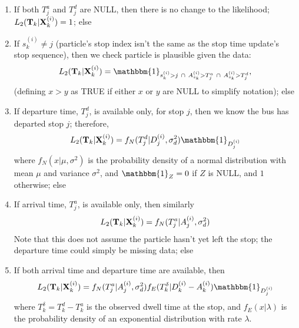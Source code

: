 \documentclass[draftcls,a4paper,onecolumn]{IEEEtran}\usepackage[]{graphicx}\usepackage[]{color}
\begin{document}
\begin{enumerate}
\item 
  If both $T^a_j$ and $T^d_j$ are NULL, 
  then there is no change to the likelihood;
  $ L_2  (\mathbf{T}_k | \mathbf{X}_k^{(i)}) = 1 $; else
  
\item
  If $s_k^{(i)} \neq j$ (particle's stop index isn't the same as the stop time update's stop sequence),
  then we check particle is plausible given the data:
  \begin{equation}
    \label{eq:l2a}
    L_2 (\bT_k | \bX_k^{(i)}) =
    \mathbbm{1}_{s_k^{(i)} > j\ \cap\ A_{s_k}^{(i)} > T_j^a\ \cap\ A_{s_k}^{(i)} > T_j^d},
  \end{equation}
  (defining $x > y$ as TRUE if either $x$ or $y$ are NULL to simplify notation); else
  

\item
  If departure time, $T^d_j$, is available only, for stop $j$, then we
  know the bus has departed stop $j$; therefore,
  \begin{equation}
    \label{eq:l2}
    L_2 (\bT_k | \bX_k^{(i)}) =
        f_N(T_j^d | D_j^{(i)}, \sigma_d^2) \mathbbm{1}_{D_j^{(i)}}
  \end{equation}
  where $f_N(x | \mu, \sigma^2)$ is the probability density of a normal distribution
  with mean $\mu$ and variance $\sigma^2$,
  and $\mathbbm{1}_Z = 0$ if $Z$ is NULL, and $1$ otherwise; else
  
\item
  If arrival time, $T^a_j$, is available only, then similarly
  \begin{equation}
    \label{eq:l2b}
    L_2  (\mathbf{T}_k | \mathbf{X}_k^{(i)}) =
      f_N(T_j^a | A_j^{(i)}, \sigma_d^2)
  \end{equation}
  Note that this does not assume the particle hasn't yet left the stop;
  the departure time could simply be missing data; else
  
\item
  If both arrival time and departure time are available, then
  \begin{equation}
    \label{eq:l2c}
    L_2  (\bT_k | \bX_k^{(i)}) =
        f_N(T_j^a| A_j^{(i)}, \sigma_d^2) f_E(T_k^\delta | D_k^{(i)} - A_k^{(i)}) \mathbbm{1}_{D_j^{(i)}}
  \end{equation}
  where $T_k^\delta = T_k^d - T_k^a$ is the observed dwell time at the stop,
  and $f_E(x | \lambda)$ is the probability density of an exponential distribution 
  with rate $\lambda$.
  
\end{enumerate}
\end{document}
